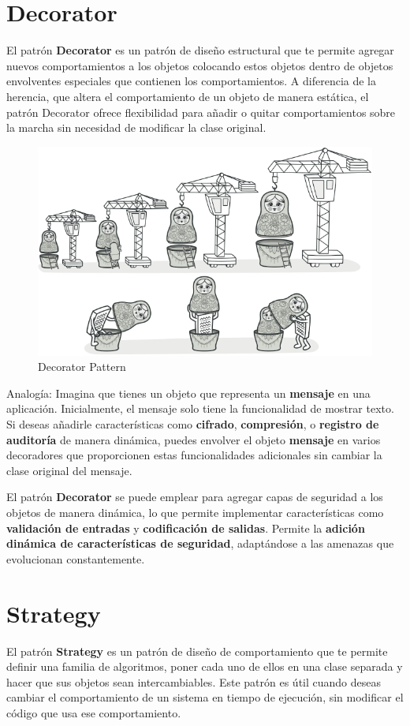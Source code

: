 \section{Decorator}

El patrón \textbf{Decorator} es un patrón de diseño estructural que te permite agregar nuevos comportamientos a los objetos colocando estos objetos dentro de objetos envolventes especiales que contienen los comportamientos. A diferencia de la herencia, que altera el comportamiento de un objeto de manera estática, el patrón Decorator ofrece flexibilidad para añadir o quitar comportamientos sobre la marcha sin necesidad de modificar la clase original.

\begin{figure}[H]
    \centering
    \includegraphics[width=0.5\linewidth]{PatronesSoftware/decorator.png}
    \caption{Decorator Pattern}
    \label{fig:decorator-pattern}
\end{figure}
Analogía: Imagina que tienes un objeto que representa un \textbf{mensaje} en una aplicación. Inicialmente, el mensaje solo tiene la funcionalidad de mostrar texto. Si deseas añadirle características como \textbf{cifrado}, \textbf{compresión}, o \textbf{registro de auditoría} de manera dinámica, puedes envolver el objeto \textbf{mensaje} en varios decoradores que proporcionen estas funcionalidades adicionales sin cambiar la clase original del mensaje. 

El patrón \textbf{Decorator} se puede emplear para agregar capas de seguridad a los objetos de manera dinámica, lo que permite implementar características como \textbf{validación de entradas} y \textbf{codificación de salidas}. Permite la \textbf{adición dinámica de características de seguridad}, adaptándose a las amenazas que evolucionan constantemente.

\section{Strategy}

El patrón \textbf{Strategy} es un patrón de diseño de comportamiento que te permite definir una familia de algoritmos, poner cada uno de ellos en una clase separada y hacer que sus objetos sean intercambiables. Este patrón es útil cuando deseas cambiar el comportamiento de un sistema en tiempo de ejecución, sin modificar el código que usa ese comportamiento.

